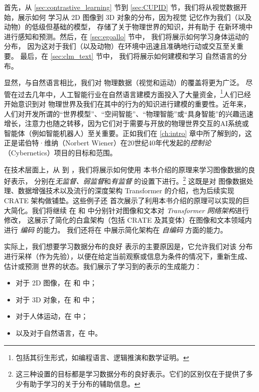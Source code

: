 \documentclass[../../book-main_zh.tex]{subfiles}
\begin{document}
首先，从 \ref{sec:contrastive_learning} 节到
\ref{sec:CUPID} 节，我们将从视觉数据开始，展示如何
学习从 2D 图像到 3D 对象的分布，因为视觉
记忆作为我们（以及动物）的低级但基础的模型，
存储了关于物理世界的知识，并有助于
在新环境中进行感知和预测。然后，在 \ref{sec:egoallo} 节中，
我们将展示如何学习身体运动的分布，
因为这对于我们（以及动物）在环境中迅速且准确地行动或交互至关重要。
最后，在 \ref{sec:clm_text} 节中，
我们将展示如何建模和学习
自然语言的分布。

显然，与自然语言相比，我们对
物理数据（视觉和运动）的覆盖将更为广泛。
尽管在过去几年中，人工智能行业在自然语言建模方面投入了大量资金，\footnote{包括其衍生形式，如编程语言、逻辑推演和数学证明。}人们已经开始意识到对
物理世界及我们在其中的行为的知识进行建模的重要性。近年来，人们对开发所谓的“世界模型”、“空间智能”、“物理智能”或“具身智能”的兴趣迅速增长，注意力也随之转移，因为它们对于需要与开放的物理世界交互的AI系统或智能体（例如智能机器人）至关重要。正如我们在 \ref{ch:intro} 章中所了解到的，这正是诺伯特·维纳（Norbert Wiener）在20世纪40年代发起的{\em 控制论}（Cybernetics）项目的目标和范围。  

在技术层面上，从  到
，我们将展示如何使用
本书介绍的原理来学习图像数据的良好表示，
分别在{\em 无监督、弱监督}和{\em 有监督}
的设置下进行。\footnote{这三种设置的目标都是学习数据分布的良好表示。它们的区别仅在于提供了多少有助于学习的关于分布的辅助信息。} 这既是对
图像数据处理、数据增强技术以及流行的深度架构 Transformer 的介绍，也为后续实现 CRATE 架构做铺垫。这些例子还
首次展示了利用本书介绍的原理可以实现的巨大简化。我们将继续
在  和  中分别针对图像和文本对 \textit{Transformer 网络架构}进行修改，
这展示了简化的白盒架构（包括 CRATE 及其变体）在图像和文本领域内进行 \textit{编码} 的能力。
我们还将在  中展示简化架构在 \textit{自编码} 方面的能力。 %

实际上，我们想要学习数据分布的良好
表示的主要原因是，它允许我们对该
分布进行采样（作为先验），以便在给定当前观察或信息为条件的情况下，重新生成、估计或预测
世界的状态。我们展示了学习到的表示的生成能力：
\begin{itemize}
\item 对于 2D 图像，在  和
 中；
\item 对于 3D 对象，在
 和  中； 
\item 对于人体运动，在  中；
\item 以及对于自然语言，在  中。
\end{itemize} 
\end{document}
